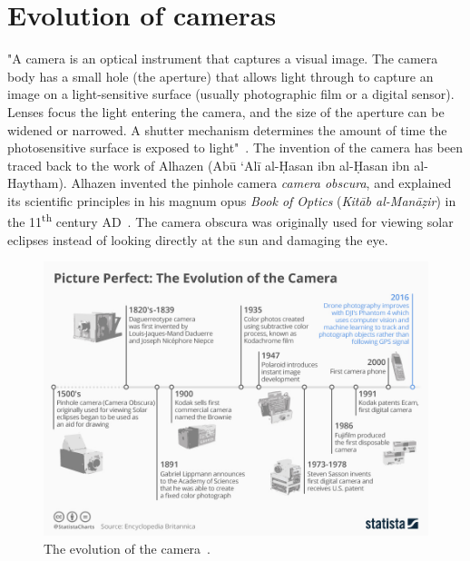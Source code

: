 \section{Evolution of cameras}
"A camera is an optical instrument that captures a visual image.
The camera body has a small hole (the aperture) that allows light through to capture an image on a light-sensitive surface (usually photographic film or a digital sensor). Lenses focus the light entering the camera, and the size of the aperture can be widened or narrowed. A shutter mechanism determines the amount of time the photosensitive surface is exposed to light"~\cite{cameraWiki}.
The invention of the camera has been traced back to the work of Alhazen (Ab\={u} `Al\={i} al-\d{H}asan ibn al-\d{H}asan ibn al-Haytham). Alhazen invented the pinhole camera \emph{camera obscura}, and explained its scientific principles in his magnum opus \textit{Book of Optics} (\textit{Kit\={a}b al-Man\={a}\d{z}ir}) in the 11\textsuperscript{th} century AD~\cite{al2015retrospect}. 
The camera obscura was originally used for viewing solar eclipses instead of looking directly at the sun and damaging the eye.

\begin{figure}[hb]
    \centering
    \includegraphics[width=\textwidth]{Figures/camera_timeline.jpeg}
    \caption{The evolution of the camera~\cite{statista2019camera}.}
    \label{fig:CameraEvolution}
\end{figure}

